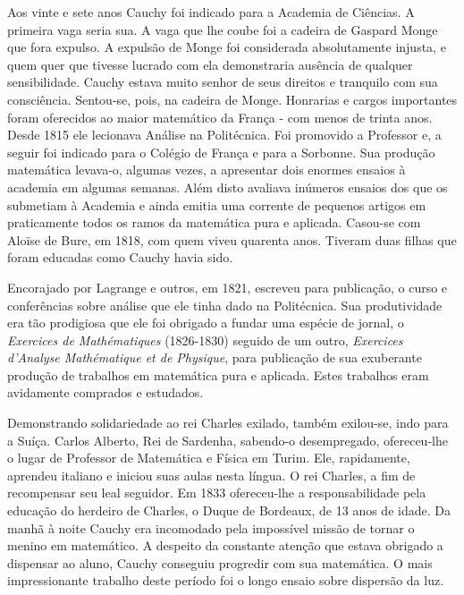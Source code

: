 Aos vinte e sete anos Cauchy foi indicado para a Academia de Ciências. A primeira vaga seria sua. A vaga que lhe coube foi a cadeira de Gaspard Monge que fora expulso. A expulsão de Monge foi considerada absolutamente injusta, e quem quer que tivesse lucrado com ela demonstraria ausência de qualquer sensibilidade. Cauchy estava muito senhor de seus direitos e tranquilo com sua consciência. Sentou-se, pois, na cadeira de Monge. Honrarias e cargos importantes foram oferecidos ao maior matemático da França - com menos de trinta anos. Desde 1815 ele lecionava Análise na Politécnica. Foi promovido a Professor e, a seguir foi indicado para o Colégio de França e para a Sorbonne. Sua produção matemática levava-o, algumas vezes, a apresentar dois enormes ensaios à academia em algumas semanas. Além disto avaliava inúmeros ensaios dos que os submetiam à Academia e ainda emitia uma corrente de pequenos artigos em praticamente todos os ramos da matemática pura e aplicada. Casou-se com Aloïse de Bure, em 1818, com quem viveu quarenta anos. Tiveram duas filhas que foram educadas como Cauchy havia sido.

Encorajado por Lagrange e outros, em 1821, escreveu para publicação, o curso e conferências sobre análise que ele tinha dado na Politécnica. Sua produtividade era tão prodigiosa que ele foi obrigado a fundar uma espécie de jornal, o \textit{Exercices de Mathématiques} (1826-1830) seguido de um outro, \textit{Exercices d'Analyse Mathématique et de Physique}, para publicação de sua exuberante produção de trabalhos em matemática pura e aplicada. Estes trabalhos eram avidamente comprados e estudados.

Demonstrando solidariedade ao rei Charles exilado, também exilou-se, indo para a Suíça. Carlos Alberto, Rei de Sardenha, sabendo-o desempregado, ofereceu-lhe o lugar de Professor de Matemática e Física em Turim. Ele, rapidamente, aprendeu italiano e iniciou suas aulas nesta língua. O rei Charles, a fim de recompensar seu leal seguidor. Em 1833 ofereceu-lhe a responsabilidade pela educação do herdeiro de Charles, o Duque de Bordeaux, de 13 anos de idade. Da manhã à noite Cauchy era incomodado pela impossível missão de tornar o menino em matemático. A despeito da constante atenção que estava obrigado a dispensar ao aluno, Cauchy conseguiu progredir com sua matemática. O mais impressionante trabalho deste período foi o longo ensaio sobre dispersão da luz.

